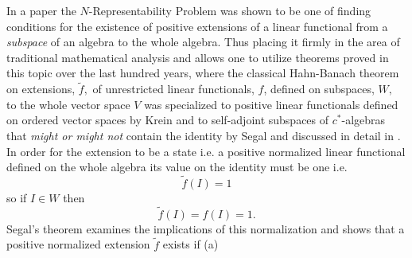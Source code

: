 \documentclass[aps,preprint]{revtex4}%
\begin{document}
In a paper \cite{Weiner83} the $N$-Representability Problem was shown to be
one of finding conditions for the existence of positive extensions of a linear
functional from a \emph{subspace} of an algebra to the whole algebra. Thus
placing it firmly in the area of traditional mathematical analysis and allows
one to utilize theorems proved in this topic over the last hundred years,
where the classical Hahn-Banach theorem \cite{Encyclo} on extensions,
$\tilde{f},$ of unrestricted linear functionals, $f$, defined on subspaces,
$W,$ to the whole vector space $V$ was specialized to positive linear
functionals defined on ordered vector spaces by Krein \cite{Krein,Naimark} and
to self-adjoint subspaces of $c^{\ast}$-algebras \cite{Encyclo} that
\emph{might or might not }contain the identity by Segal \cite{Segal} and
discussed in detail in \cite{KadisonRinrose}. In order for the extension to be
a state \cite{Encyclo} i.e. a positive normalized linear functional defined on
the whole algebra its value on the identity must be one i.e.
\begin{equation}
\tilde{f}\left(  I\right)  =1
\end{equation}
so if $I\in W$ then
\begin{equation}
\tilde{f}\left(  I\right)  =f\left(  I\right)  =1.
\end{equation}
Segal's theorem examines the implications of this normalization and shows that
a positive normalized extension $\tilde{f}$ exists if (a)%
\end{document}
